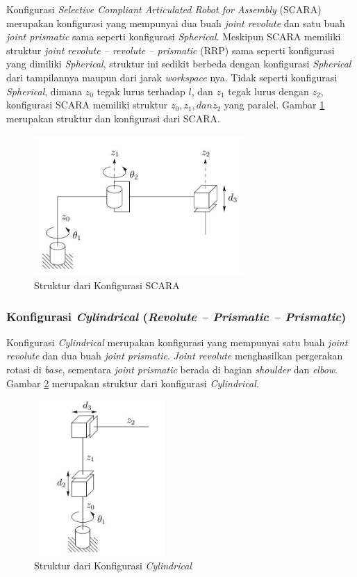 Konfigurasi \textit{Selective Compliant Articulated Robot for Assembly} (SCARA) merupakan konfigurasi yang mempunyai dua buah \textit{joint revolute} dan satu buah \textit{joint prismatic} sama seperti konfigurasi \textit{Spherical}. Meskipun SCARA memiliki struktur \textit{joint revolute – revolute – prismatic} (RRP) sama seperti konfigurasi yang dimiliki \textit{Spherical}, struktur ini sedikit berbeda dengan konfigurasi \textit{Spherical} dari tampilannya maupun dari jarak \textit{workspace} nya. Tidak seperti konfigurasi \textit{Spherical}, dimana $z_{0}$ tegak lurus terhadap $l$, dan $z_{1}$ tegak lurus dengan $z_{2}$, konfigurasi SCARA memiliki struktur $z_{0}, z_{1}, dan z_{2}$ yang paralel. Gambar \ref{pic.scara} merupakan struktur dan konfigurasi dari SCARA.
	\begin{figure}[H]
	\centering
	\includegraphics[width=8cm]{gambar/scara.jpg}
	\caption{Struktur dari Konfigurasi SCARA\cite{Spong2006}}
	\label{pic.scara}
\end{figure}

\subsubsection{Konfigurasi \textit{Cylindrical} (\textit{Revolute – Prismatic – Prismatic}) } 

Konfigurasi \textit{Cylindrical} merupakan konfigurasi yang mempunyai satu buah \textit{joint revolute} dan dua buah \textit{joint prismatic}. \textit{Joint revolute} menghasilkan pergerakan rotasi di \textit{base}, sementara \textit{joint prismatic} berada di bagian \textit{shoulder} dan \textit{elbow}. Gambar \ref{pic.cylindrical} merupakan struktur dari konfigurasi \textit{Cylindrical.}
\begin{figure}[H]
	\centering
	\includegraphics[width=5cm]{gambar/cylindrical.jpg}
	\caption{Struktur dari Konfigurasi \textit{Cylindrical}\cite{Spong2006}}
	\label{pic.cylindrical}
\end{figure}
